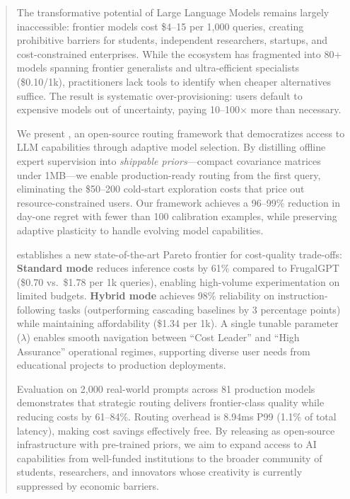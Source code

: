 
\begin{abstract}
The transformative potential of Large Language Models remains largely inaccessible: frontier models cost \$4--15 per 1,000 queries, creating prohibitive barriers for students, independent researchers, startups, and cost-constrained enterprises. While the ecosystem has fragmented into 80+ models spanning frontier generalists and ultra-efficient specialists (\$0.10/1k), practitioners lack tools to identify when cheaper alternatives suffice. The result is systematic over-provisioning: users default to expensive models out of uncertainty, paying 10--100× more than necessary.

We present \ours{}, an open-source routing framework that democratizes access to LLM capabilities through adaptive model selection. By distilling offline expert supervision into \emph{shippable priors}---compact covariance matrices under 1MB---we enable production-ready routing from the first query, eliminating the \$50--200 cold-start exploration costs that price out resource-constrained users. Our framework achieves a 96--99\% reduction in day-one regret with fewer than 100 calibration examples, while preserving adaptive plasticity to handle evolving model capabilities.

\ours{} establishes a new state-of-the-art Pareto frontier for cost-quality trade-offs: \textbf{Standard mode} reduces inference costs by 61\% compared to FrugalGPT (\$0.70 vs.\ \$1.78 per 1k queries), enabling high-volume experimentation on limited budgets. \textbf{Hybrid mode} achieves 98\% reliability on instruction-following tasks (outperforming cascading baselines by 3 percentage points) while maintaining affordability (\$1.34 per 1k). A single tunable parameter ($\lambda$) enables smooth navigation between ``Cost Leader'' and ``High Assurance'' operational regimes, supporting diverse user needs from educational projects to production deployments.

Evaluation on 2,000 real-world prompts across 81 production models demonstrates that strategic routing delivers frontier-class quality while reducing costs by 61--84\%. Routing overhead is 8.94ms P99 (1.1\% of total latency), making cost savings effectively free. By releasing \ours{} as open-source infrastructure with pre-trained priors, we aim to expand access to AI capabilities from well-funded institutions to the broader community of students, researchers, and innovators whose creativity is currently suppressed by economic barriers.
\end{abstract}

